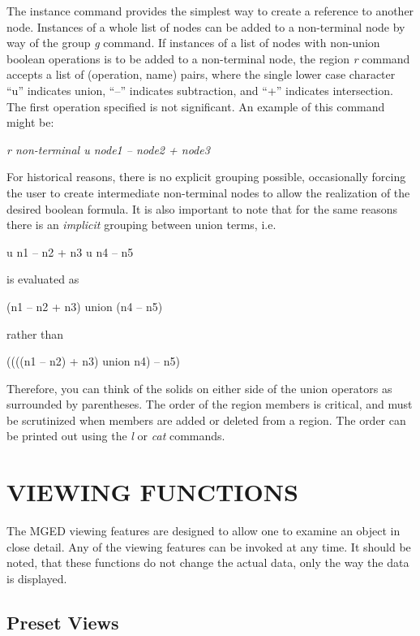 The instance command provides the simplest way to create a reference to
another node.  Instances of a whole list of nodes can be added to a
non-terminal node by way of the group {\em g} command.
If instances of a list of nodes with non-union boolean operations
is to be added to a non-terminal node, the region {\em r} command
accepts a list of (operation, name) pairs, where the single lower case
character ``u'' indicates union, ``--'' indicates subtraction, and
``+'' indicates intersection.  The first operation specified
is not significant.  An example of this command might be:
\begin{center}
{\em r non-terminal u node1 -- node2 + node3}
\end{center}
For historical reasons,
there is no explicit grouping possible, occasionally forcing
the user to create intermediate non-terminal nodes to allow the
realization of the desired boolean formula.
It is also important to note that for the same reasons
there is an {\em implicit} grouping between union terms, i.e.
\begin{center}
u n1 -- n2 + n3 u n4 -- n5
\end{center}
is evaluated as
\begin{center}
(n1 -- n2 + n3) union (n4 -- n5)
\end{center}
rather than
\begin{center}
((((n1 -- n2) + n3) union n4) -- n5)
\end{center}
Therefore, you can think of the solids
on either side of the union operators as surrounded by parentheses.
The order of the region members is
critical, and must be scrutinized when members are added or deleted from a
region.
The order can be printed out using the {\em l} or {\em cat} commands.
\chapter{VIEWING FUNCTIONS}

The MGED viewing features are designed to allow one to examine an object
in close detail.  Any of the viewing features can be invoked at any time.
It should be noted, that these functions do not change the actual data,
only the way the data is displayed.

\section{Preset Views}

